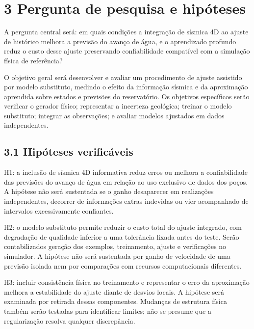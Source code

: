 \documentclass[12pt,a4paper]{article}
\begin{document}
\newpage
\section*{3 Pergunta de pesquisa e hipóteses}
A pergunta central será: em quais condições a integração de sísmica 4D ao ajuste de histórico melhora a previsão do avanço de água, e o aprendizado profundo reduz o custo desse ajuste preservando confiabilidade compatível com a simulação física de referência?\par
O objetivo geral será desenvolver e avaliar um procedimento de ajuste assistido por modelo substituto, medindo o efeito da informação sísmica e da aproximação aprendida sobre estados e previsões do reservatório. Os objetivos específicos serão verificar o gerador físico; representar a incerteza geológica; treinar o modelo substituto; integrar as observações; e avaliar modelos ajustados em dados independentes.\par
\subsection*{3.1 Hipóteses verificáveis}
H1: a inclusão de sísmica 4D informativa reduz erros ou melhora a confiabilidade das previsões do avanço de água em relação ao uso exclusivo de dados dos poços. A hipótese não será sustentada se o ganho desaparecer em realizações independentes, decorrer de informações extras indevidas ou vier acompanhado de intervalos excessivamente confiantes.\par
H2: o modelo substituto permite reduzir o custo total do ajuste integrado, com degradação de qualidade inferior a uma tolerância fixada antes do teste. Serão contabilizados geração dos exemplos, treinamento, ajuste e verificações no simulador. A hipótese não será sustentada por ganho de velocidade de uma previsão isolada nem por comparações com recursos computacionais diferentes.\par
H3: incluir consistência física no treinamento e representar o erro da aproximação melhora a estabilidade do ajuste diante de desvios locais. A hipótese será examinada por retirada dessas componentes. Mudanças de estrutura física também serão testadas para identificar limites; não se presume que a regularização resolva qualquer discrepância.\par
\end{document}
